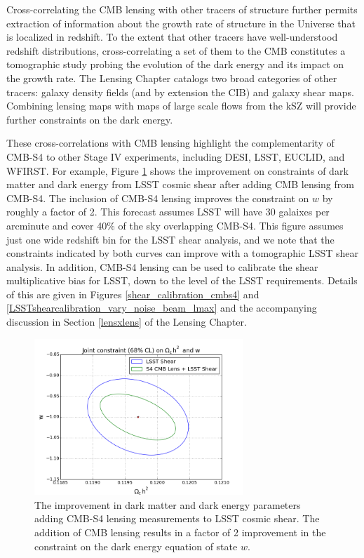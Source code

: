 Cross-correlating the CMB lensing with other tracers of structure further permits extraction of information about the growth rate of structure in the Universe that is localized in redshift.  To the extent that other tracers have well-understood redshift distributions, cross-correlating a set of them to the CMB constitutes a tomographic study probing the evolution of the dark energy and its impact on the growth rate. The Lensing Chapter catalogs two broad categories of other tracers: galaxy density fields (and by extension the CIB) and galaxy shear maps. Combining lensing maps with maps of large scale flows from the kSZ will provide further constraints on the dark energy.

These cross-correlations with CMB lensing highlight the complementarity of CMB-S4 to other Stage IV experiments, including DESI, LSST, EUCLID, and WFIRST. 
For example, Figure \ref{LSSTdarkEnergy} shows the improvement on constraints of dark matter and dark energy from LSST cosmic shear after adding CMB lensing from CMB-S4.  The inclusion of CMB-S4 lensing improves the constraint on $w$ by roughly a factor of 2.  This forecast assumes LSST will have 30 galaixes per arcminute and cover 40\% of the sky overlapping CMB-S4.  This figure assumes just one wide redshift bin for the LSST shear analysis, and we note that the constraints indicated by both curves can improve with a tomographic LSST shear analysis.   In addition, CMB-S4 lensing can be used to calibrate the shear multiplicative bias for LSST, down to the level of the LSST requirements.  Details of this are given in Figures \ref{shear_calibration_cmbs4} and \ref{LSSTshearcalibration_vary_noise_beam_lmax} and the accompanying discussion in Section \ref{lensxlens} of the Lensing Chapter.

\begin{figure}[htbp]
\centering
\includegraphics[width=0.7\textwidth]{CMBLensing/darkEnergy.png}
\caption{The improvement in dark matter and dark energy parameters adding CMB-S4 lensing measurements to LSST cosmic shear.  The addition of CMB lensing results in a factor of 2 improvement in the constraint on the dark energy equation of state $w$.}
\label{LSSTdarkEnergy}
\end{figure}


